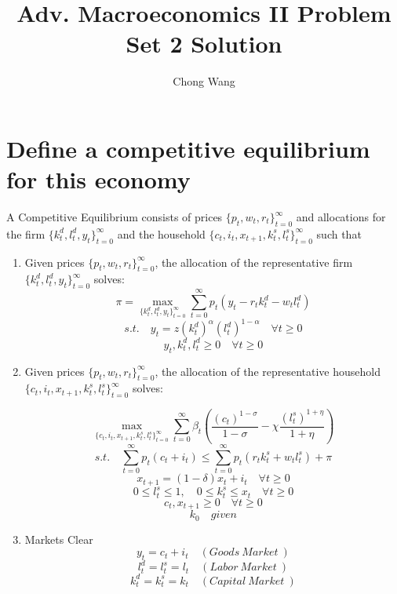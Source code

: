 \documentclass{article}
\title{Adv. Macroeconomics II Problem Set 2 Solution}
\author{Chong Wang}
\begin{document}
\maketitle
\section{Define a competitive equilibrium for this economy}
A Competitive Equilibrium consists of prices $\{p_{t}, w_{t}, r_{t}\}^{\infty}_{t=0}$ and allocations for the firm $\{k^{d}_{t}, l^{d}_{t}, y_{t}\}^{\infty}_{t=0}$ and the household $\{c_{t}, i_{t}, x_{t+1}, k^{s}_{t}, l^{s}_{t}\}^{\infty}_{t=0}$ such that
\begin{enumerate}
  \item Given prices $\{p_{t}, w_{t}, r_{t}\}^{\infty}_{t=0}$, the allocation of the representative firm $\{k^{d}_{t}, l^{d}_{t}, y_{t}\}^{\infty}_{t=0}$ solves:\\
  
  \[ \pi = \max\limits_{\{k^{d}_{t}, l^{d}_{t}, y_{t}\}^{\infty}_{t=0}} \sum_{t=0}^{\infty} p_{t}(y_{t}-r_{t}k^{d}_{t}-w_{t}l^{d}_{t}) \]
  \[ s.t.\quad y_{t} = z(k^{d}_{t})^\alpha(l^{d}_{t})^{1-\alpha}\quad \forall t\geq0\]
  \[ y_{t}, k^{d}_{t}, l^{d}_{t}\geq0\quad \forall t\geq0\]
  
  \item Given prices $\{p_{t}, w_{t}, r_{t}\}^{\infty}_{t=0}$, the allocation of the representative household $\{c_{t}, i_{t}, x_{t+1}, k^{s}_{t}, l^{s}_{t}\}^{\infty}_{t=0}$ solves:
  
   \[ \max\limits_{\{c_{t}, i_{t}, x_{t+1}, k^{s}_{t}, l^{s}_{t}\}^{\infty}_{t=0}} \sum_{t=0}^{\infty} \beta_{t}(\frac{(c_{t})^{1-\sigma}}{1-\sigma}-\chi \frac{(l^s_{t})^{1+\eta}}{1+\eta})\]
  \[ s.t.\quad \sum_{t=0}^{\infty}p_{t}(c_{t}+i_{t}) \leq \sum_{t=0}^{\infty}p_{t}(r_{t}k^{s}_{t} + w_{t}l^{s}_{t}) + \pi\]
  \[ x_{t+1} = (1-\delta)x_{t}+i_{t} \quad \forall t\geq0\]
  \[  0\leq l^{s}_{t}\leq1,\quad0\leq k^{s}_{t}\leq x_{t}\quad \forall t\geq0\]
  \[ c_{t}, x_{t+1}\geq0\quad \forall t\geq0\]
  \[ k_{0}\quad given\]
  
  \item Markets Clear
  \begin{equation}
    y_{t} = c_{t} + i_{t} \quad(Goods \:Market\:)
  \end{equation}
  \begin{equation}
  l^{d}_{t} = l^{s}_{t} = l_{t} \quad(Labor \:Market\:)
  \end{equation}
  \begin{equation}
  k^{d}_{t} = k^{s}_{t} =k_{t}\quad(Capital \:Market\:)
  \end{equation}
\end{enumerate}
\end{document}
